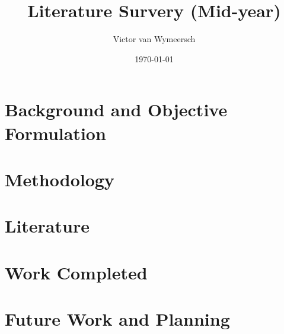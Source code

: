 \documentclass{article}
\title{Literature Survery (Mid-year)}
\author{Victor van Wymeersch}
\date{\today}
\begin{document}
\maketitle

 
\section{Background and Objective Formulation}

\section{Methodology}
 
\section{Literature}

\section{Work Completed}

\section{Future Work and Planning}
 
\end{document}
